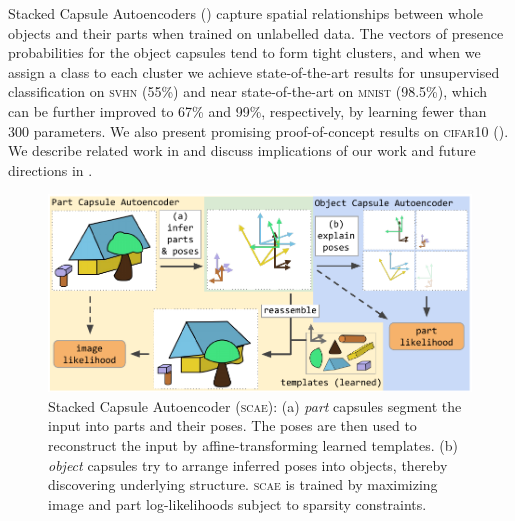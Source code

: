Stacked Capsule Autoencoders () capture spatial relationships between whole objects and their parts when trained on unlabelled data.
The vectors of presence probabilities for the object capsules tend to form tight clusters, and when we assign a class to each cluster we achieve state-of-the-art results for unsupervised classification on \textsc{svhn} (55\%) and near state-of-the-art on \textsc{mnist} (98.5\%), which can be further improved to 67\% and 99\%, respectively, by learning fewer than 300 parameters. We also present promising proof-of-concept results on \textsc{cifar10} ().
We describe related work in  and discuss implications of our work and future  directions in .

\begin{figure}
        \centering
        \includegraphics[width=.68\linewidth]{figures/SCA/blocks_v4}
        \caption{
            Stacked Capsule Autoencoder (\textsc{scae}):
            (a) \textit{part} capsules segment the input into parts and their poses. The poses are then used to reconstruct the input by affine-transforming learned templates.
            (b) \textit{object} capsules try to arrange inferred poses into objects, thereby discovering underlying structure.
            \textsc{scae} is trained by maximizing image and part log-likelihoods subject to sparsity constraints.
        }
        \label{fig:capsule_arch}
\end{figure}


